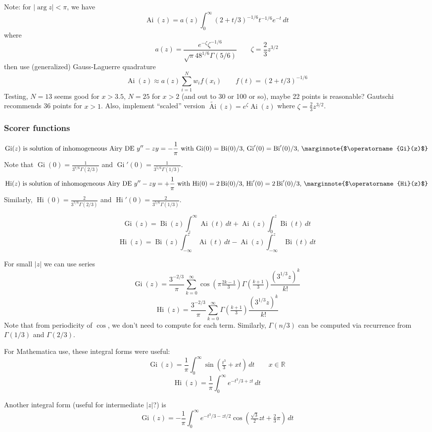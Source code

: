 \documentclass[10pt,dvipdfmx,letterpaper,twoside]{article}
\let\O=\operatorname
\newcommand{\RR}{{\mathbb{R}}}
\let\DEF=\marginnote
\let\Gam=\Gamma
\begin{document}
Note:
for $|\arg z|<\pi$, we have
\[ \O{Ai}(z) = a(z)\int_0^\infty (2+t/3)^{-1/6}t^{-1/6} e^{-t}\,dt \]
where
\[ a(z) = \frac{e^{-\zeta}\zeta^{-1/6}}{\sqrt{\pi} 48^{1/6} \Gam(5/6)} \qquad \zeta=\frac23 z^{3/2} \]
then use (generalized) Gauss-Laguerre quadrature
\[ \O{Ai}(z) \approx a(z)\sum_{i=1}^{N} w_i f(x_i) \qquad f(t) = (2+t/3)^{-1/6} \]
Testing, $N=13$ seems good for $x>3.5$, $N=25$ for $x>2$ (and out to 30 or 100 or so), maybe 22 points is reasonable?
Gautschi recommends 36 points for $x>1$.
Also, implement ``scaled'' version $\widetilde{\O{Ai}}(z) = e^\zeta \O{Ai}(z)$ where $\zeta=\frac23 z^{3/2}$.

\subsubsection{Scorer functions}
\[ \O{Gi}(z) \text{\ is solution of inhomogeneous Airy DE $y''-z y = -\frac1\pi$ with $\O{Gi}(0)=\O{Bi}(0)/3$, $\O{Gi}'(0)=\O{Bi}'(0)/3$, }
  \DEF{$\O{Gi}(z)$} \]
Note that $\O{Gi}(0) = \frac{1}{3^{7/6}\Gam(2/3)}$ and $\O{Gi}'(0) = \frac{1}{3^{5/6}\Gam(1/3)}$.
\[ \O{Hi}(z) \text{\ is solution of inhomogeneous Airy DE $y''-z y = +\frac1\pi$ with $\O{Hi}(0)=2\O{Bi}(0)/3$, $\O{Hi}'(0)=2\O{Bi}'(0)/3$, }
  \DEF{$\O{Hi}(z)$} \]
Similarly, $\O{Hi}(0) = \frac{2}{3^{7/6}\Gam(2/3)}$ and $\O{Hi}'(0) = \frac{2}{3^{5/6}\Gam(1/3)}$.

\[ \O{Gi}(z) = \O{Bi}(z)\int_z^\infty\O{Ai}(t)\,dt + \O{Ai}(z)\int_0^z\O{Bi}(t)\,dt \]
\[ \O{Hi}(z) = \O{Bi}(z)\int_{-\infty}^z\O{Ai}(t)\,dt - \O{Ai}(z)\int_{-\infty}^z\O{Bi}(t)\,dt \]

For small $|z|$ we can use series
\[ \O{Gi}(z) = \frac{3^{-2/3}}{\pi}\sum_{k=0}^\infty \cos(\pi\tfrac{2k-1}{3})\Gam(\tfrac{k+1}{3})\frac{(3^{1/3} z)^k}{k!} \]
\[ \O{Hi}(z) = \frac{3^{-2/3}}{\pi}\sum_{k=0}^\infty                         \Gam(\tfrac{k+1}{3})\frac{(3^{1/3} z)^k}{k!} \]
Note that from periodicity of $\cos$, we don't need to compute for each term.
Similarly, $\Gam(n/3)$ can be computed via recurrence from $\Gam(1/3)$ and $\Gam(2/3)$.

For Mathematica use, these integral forms were useful:
\[ \O{Gi}(z) = \frac{1}{\pi}\int_0^\infty\sin(\tfrac{t^3}{3} + xt)\,dt \qquad x\in\RR \]
\[ \O{Hi}(z) = \frac{1}{\pi}\int_0^\infty e^{-t^3/3 + zt}\,dt \]

Another integral form (useful for intermediate $|z|$?) is
\[ \O{Gi}(z) = -\frac{1}{\pi}\int_0^\infty e^{-t^3/3 - zt/2}\cos(\tfrac{\sqrt3}{2}zt + \tfrac23\pi)\,dt \]
\end{document}
